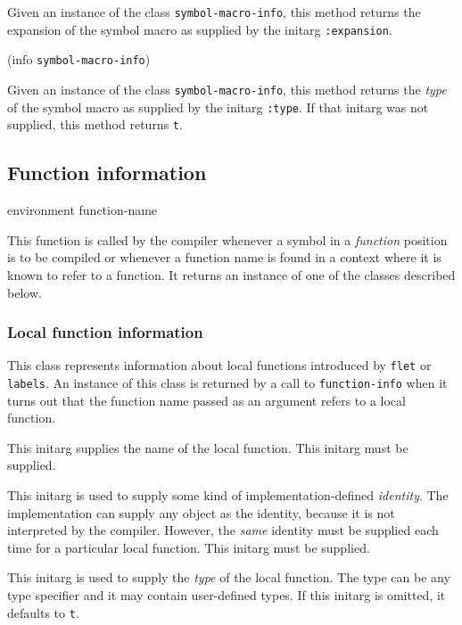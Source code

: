 Given an instance of the class \texttt{symbol-macro-info}, this method
returns the expansion of the symbol macro as supplied by the initarg
\texttt{:expansion}.

 {(info {\tt symbol-macro-info})}

Given an instance of the class \texttt{symbol-macro-info}, this method
returns the \emph{type} of the symbol macro as supplied by the initarg
\texttt{:type}.  If that initarg was not supplied, this method returns
\texttt{t}.

\subsection{Function information}

 {environment function-name}

This function is called by the compiler whenever a symbol in a
\emph{function} position is to be compiled or whenever a function name
is found in a context where it is known to refer to a function.  It
returns an instance of one of the classes described below.

\subsubsection{Local function information}


This class represents information about local functions introduced by
\texttt{flet} or \texttt{labels}.  An instance of this class is
returned by a call to \texttt{function-info} when it turns out that
the function name passed as an argument refers to a local function. 


This initarg supplies the name of the local function.  This initarg
must be supplied.


This initarg is used to supply some kind of implementation-defined 
\emph{identity}.  The implementation can supply any object as the
identity, because it is not interpreted by the compiler.  However, the
\emph{same} identity must be supplied each time for a particular
local function.  This initarg must be supplied. 


This initarg is used to supply the \emph{type} of the local function.
The type can be any type specifier and it may contain user-defined
types.  If this initarg is omitted, it defaults to \texttt{t}.

